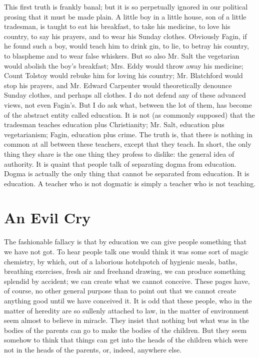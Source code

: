 \documentclass{book}
\begin{document}
This first truth is frankly banal; but it is so perpetually ignored in our political prosing that it must be made plain. A little boy in a little house, son of a little tradesman, is taught to eat his breakfast, to take his medicine, to love his country, to say his prayers, and to wear his Sunday clothes. Obviously Fagin, if he found such a boy, would teach him to drink gin, to lie, to betray his country, to blaspheme and to wear false whiskers. But so also Mr. Salt the vegetarian would abolish the boy’s breakfast; Mrs. Eddy would throw away his medicine; Count Tolstoy would rebuke him for loving his country; Mr. Blatchford would stop his prayers, and Mr. Edward Carpenter would theoretically denounce Sunday clothes, and perhaps all clothes. I do not defend any of these advanced views, not even Fagin’s. But I do ask what, between the lot of them, has become of the abstract entity called education. It is not (as commonly supposed) that the tradesman teaches education plus Christianity; Mr. Salt, education plus vegetarianism; Fagin, education plus crime. The truth is, that there is nothing in common at all between these teachers, except that they teach. In short, the only thing they share is the one thing they profess to dislike: the general idea of authority. It is quaint that people talk of separating dogma from education. Dogma is actually the only thing that cannot be separated from education. It is education. A teacher who is not dogmatic is simply a teacher who is not teaching.

\chapter{An Evil Cry}
\label{chapter-36}
The fashionable fallacy is that by education we can give people something that we have not got. To hear people talk one would think it was some sort of magic chemistry, by which, out of a laborious hotchpotch of hygienic meals, baths, breathing exercises, fresh air and freehand drawing, we can produce something splendid by accident; we can create what we cannot conceive. These pages have, of course, no other general purpose than to point out that we cannot create anything good until we have conceived it. It is odd that these people, who in the matter of heredity are so sullenly attached to law, in the matter of environment seem almost to believe in miracle. They insist that nothing but what was in the bodies of the parents can go to make the bodies of the children. But they seem somehow to think that things can get into the heads of the children which were not in the heads of the parents, or, indeed, anywhere else.
\end{document}
